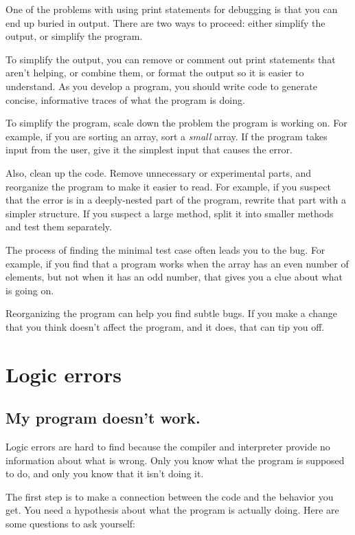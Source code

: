\documentclass[12pt]{book}
\theoremstyle{exercise}
\begin{document}

One of the problems with using print statements for debugging is that you can end up buried in output.
There are two ways to proceed: either simplify the output, or simplify the program.

To simplify the output, you can remove or comment out print statements that aren't helping, or combine them, or format the output so it is easier to understand.
As you develop a program, you should write code to generate concise, informative traces of what the program is doing.

To simplify the program, scale down the problem the program is working on.
For example, if you are sorting an array, sort a {\em small} array.
If the program takes input from the user, give it the simplest input that causes the error.

Also, clean up the code.
Remove unnecessary or experimental parts, and reorganize the program to make it easier to read.
For example, if you suspect that the error is in a deeply-nested part of the program, rewrite that part with a simpler structure.
If you suspect a large method, split it into smaller methods and test them separately.

The process of finding the minimal test case often leads you to the bug.
For example, if you find that a program works when the array has an even number of elements, but not when it has an odd number, that gives you a clue about what is going on.

Reorganizing the program can help you find subtle bugs.
If you make a change that you think doesn't affect the program, and it does, that can tip you off.


\section{Logic errors}

\subsection*{My program doesn't work.}

Logic errors are hard to find because the compiler and interpreter provide no information about what is wrong.
Only you know what the program is supposed to do, and only you know that it isn't doing it.

The first step is to make a connection between the code and the behavior you get.
You need a hypothesis about what the program is actually doing.
Here are some questions to ask yourself:
\end{document}
